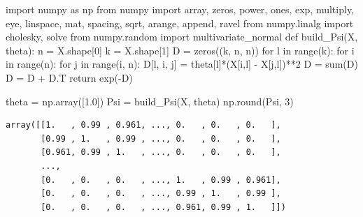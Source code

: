\documentclass[
  letterpaper,
  DIV=11,
  numbers=noendperiod]{scrreprt}
\newenvironment{Shaded}{\begin{snugshade}}{\end{snugshade}}
\newcommand{\BuiltInTok}[1]{\textcolor[rgb]{0.00,0.23,0.31}{#1}}
\newcommand{\ControlFlowTok}[1]{\textcolor[rgb]{0.00,0.23,0.31}{#1}}
\newcommand{\DecValTok}[1]{\textcolor[rgb]{0.68,0.00,0.00}{#1}}
\newcommand{\FloatTok}[1]{\textcolor[rgb]{0.68,0.00,0.00}{#1}}
\newcommand{\ImportTok}[1]{\textcolor[rgb]{0.00,0.46,0.62}{#1}}
\newcommand{\KeywordTok}[1]{\textcolor[rgb]{0.00,0.23,0.31}{#1}}
\newcommand{\NormalTok}[1]{\textcolor[rgb]{0.00,0.23,0.31}{#1}}
\newcommand{\OperatorTok}[1]{\textcolor[rgb]{0.37,0.37,0.37}{#1}}
\begin{document}
\begin{Shaded}
\begin{Highlighting}[]
\ImportTok{import}\NormalTok{ numpy }\ImportTok{as}\NormalTok{ np}
\ImportTok{from}\NormalTok{ numpy }\ImportTok{import}\NormalTok{ array, zeros, power, ones, exp, multiply, eye, linspace, mat, spacing, sqrt, arange, append, ravel}
\ImportTok{from}\NormalTok{ numpy.linalg }\ImportTok{import}\NormalTok{ cholesky, solve}
\ImportTok{from}\NormalTok{ numpy.random }\ImportTok{import}\NormalTok{ multivariate\_normal}
\KeywordTok{def}\NormalTok{ build\_Psi(X, theta):}
\NormalTok{    n }\OperatorTok{=}\NormalTok{ X.shape[}\DecValTok{0}\NormalTok{]}
\NormalTok{    k }\OperatorTok{=}\NormalTok{ X.shape[}\DecValTok{1}\NormalTok{]}
\NormalTok{    D }\OperatorTok{=}\NormalTok{ zeros((k, n, n))}
    \ControlFlowTok{for}\NormalTok{ l }\KeywordTok{in} \BuiltInTok{range}\NormalTok{(k):}
        \ControlFlowTok{for}\NormalTok{ i }\KeywordTok{in} \BuiltInTok{range}\NormalTok{(n):}
            \ControlFlowTok{for}\NormalTok{ j }\KeywordTok{in} \BuiltInTok{range}\NormalTok{(i, n):}
\NormalTok{                D[l, i, j] }\OperatorTok{=}\NormalTok{ theta[l]}\OperatorTok{*}\NormalTok{(X[i,l] }\OperatorTok{{-}}\NormalTok{ X[j,l])}\OperatorTok{**}\DecValTok{2}
\NormalTok{    D }\OperatorTok{=} \BuiltInTok{sum}\NormalTok{(D)}
\NormalTok{    D }\OperatorTok{=}\NormalTok{ D }\OperatorTok{+}\NormalTok{ D.T}
    \ControlFlowTok{return}\NormalTok{ exp(}\OperatorTok{{-}}\NormalTok{D)  }
\end{Highlighting}
\end{Shaded}

\begin{Shaded}
\begin{Highlighting}[]
\NormalTok{theta }\OperatorTok{=}\NormalTok{ np.array([}\FloatTok{1.0}\NormalTok{])}
\NormalTok{Psi }\OperatorTok{=}\NormalTok{ build\_Psi(X, theta)}
\NormalTok{np.}\BuiltInTok{round}\NormalTok{(Psi, }\DecValTok{3}\NormalTok{)}
\end{Highlighting}
\end{Shaded}

\begin{verbatim}
array([[1.   , 0.99 , 0.961, ..., 0.   , 0.   , 0.   ],
       [0.99 , 1.   , 0.99 , ..., 0.   , 0.   , 0.   ],
       [0.961, 0.99 , 1.   , ..., 0.   , 0.   , 0.   ],
       ...,
       [0.   , 0.   , 0.   , ..., 1.   , 0.99 , 0.961],
       [0.   , 0.   , 0.   , ..., 0.99 , 1.   , 0.99 ],
       [0.   , 0.   , 0.   , ..., 0.961, 0.99 , 1.   ]])
\end{verbatim}
\end{document}

